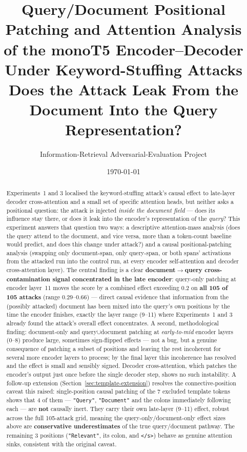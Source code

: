\documentclass[11pt]{article}
\title{\textbf{Query/Document Positional Patching and Attention Analysis \\[2pt]
of the monoT5 Encoder--Decoder Under Keyword-Stuffing Attacks} \\[6pt]
\large Does the Attack Leak From the Document Into the Query Representation?}
\author{Information-Retrieval Adversarial-Evaluation Project}
\date{\today}
\begin{document}
\maketitle

\begin{abstract}
Experiments~1 and 3 localised the keyword-stuffing attack's causal effect to
late-layer decoder cross-attention and a small set of specific attention
heads, but neither asks a positional question: the attack is injected
\emph{inside the document field} — does its influence stay there, or does it
leak into the encoder's representation of the \emph{query}? This experiment
answers that question two ways: a descriptive attention-mass analysis (does
the query attend to the document, and vice versa, more than a token-count
baseline would predict, and does this change under attack?) and a causal
positional-patching analysis (swapping only document-span, only query-span,
or both spans' activations from the attacked run into the control run, at
every encoder self-attention and decoder cross-attention layer). The central
finding is a clear \textbf{document$\to$query cross-contamination signal
concentrated in the late encoder}: query-only patching at encoder layer~11
moves the score by a combined effect exceeding $0.2$ on \textbf{all 105 of
105 attacks} (range $0.29$--$0.66$) — direct causal evidence that information
from the (possibly attacked) document has been mixed into the query's own
positions by the time the encoder finishes, exactly the layer range
(9--11) where Experiments~1 and 3 already found the attack's overall effect
concentrates. A second, methodological finding: document-only and
query$\cup$document patching at \emph{early-to-mid} encoder layers (0--8)
produce large, sometimes sign-flipped effects — not a bug, but a genuine
consequence of patching a subset of positions and leaving the rest
incoherent for several more encoder layers to process; by the final layer
this incoherence has resolved and the effect is small and sensibly signed.
Decoder cross-attention, which patches the encoder's output just once before
the single decoder step, shows no such instability. A follow-up extension
(Section~\ref{sec:template-extension}) resolves the connective-position
caveat this raised: single-position causal patching of the 7 excluded
template tokens shows that 4 of them — \texttt{"Query"}, \texttt{"Document"}
and the colons immediately following each — are \textbf{not} causally inert.
They carry their own late-layer (9--11) effect, robust across the full
105-attack grid, meaning the query-only/document-only effect sizes above are
\textbf{conservative underestimates} of the true query/document pathway. The
remaining 3 positions (\texttt{"Relevant"}, its colon, and \texttt{</s>})
behave as genuine attention sinks, consistent with the original caveat.
\end{abstract}
\end{document}
